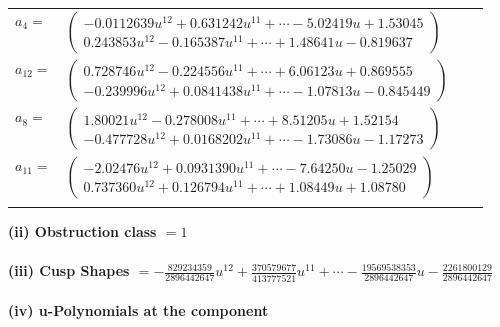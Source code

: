 \documentclass[1p]{elsarticle_modified}
\theoremstyle{definition}
\begin{document}
\begin{tabular}{m{7pt} m{180pt} m{7pt} m{180pt} }
\flushright $a_{4}=$&$\begin{pmatrix}-0.0112639 u^{12}+0.631242 u^{11}+\cdots-5.02419 u+1.53045\\0.243853 u^{12}-0.165387 u^{11}+\cdots+1.48641 u-0.819637\end{pmatrix}$ \\
\flushright $a_{12}=$&$\begin{pmatrix}0.728746 u^{12}-0.224556 u^{11}+\cdots+6.06123 u+0.869555\\-0.239996 u^{12}+0.0841438 u^{11}+\cdots-1.07813 u-0.845449\end{pmatrix}$ \\
\flushright $a_{8}=$&$\begin{pmatrix}1.80021 u^{12}-0.278008 u^{11}+\cdots+8.51205 u+1.52154\\-0.477728 u^{12}+0.0168202 u^{11}+\cdots-1.73086 u-1.17273\end{pmatrix}$ \\
\flushright $a_{11}=$&$\begin{pmatrix}-2.02476 u^{12}+0.0931390 u^{11}+\cdots-7.64250 u-1.25029\\0.737360 u^{12}+0.126794 u^{11}+\cdots+1.08449 u+1.08780\end{pmatrix}$\\&\end{tabular}
\flushleft \textbf{(ii) Obstruction class $= 1$}\\~\\
\flushleft \textbf{(iii) Cusp Shapes $= -\frac{829234359}{2896442647} u^{12}+\frac{370579677}{413777521} u^{11}+\cdots-\frac{19569538353}{2896442647} u-\frac{2261800129}{2896442647}$}\\~\\
\newpage\renewcommand{\arraystretch}{1}
\flushleft \textbf{(iv) u-Polynomials at the component}\newline \\
\end{document}
